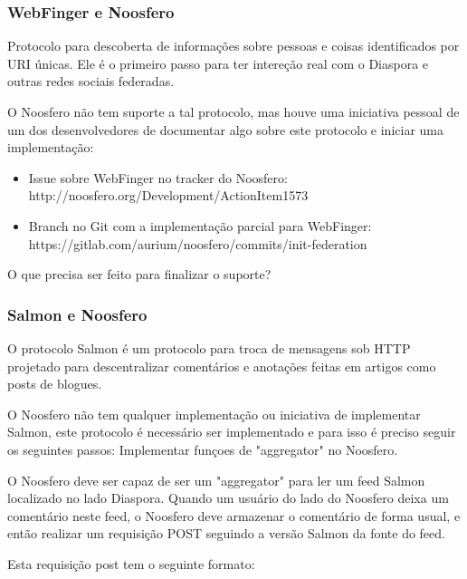 \documentclass[12pt]{article}
\begin{document}
\subsubsection{WebFinger e Noosfero}

Protocolo para descoberta de informações sobre pessoas e coisas identificados
por URI únicas. Ele é o primeiro passo para ter intereção real com o Diaspora
e outras redes sociais federadas.

O Noosfero não tem suporte a tal protocolo, mas houve uma iniciativa pessoal
de um dos desenvolvedores de documentar algo sobre este protocolo e iniciar
uma implementação:

\begin{itemize}
  \item Issue sobre WebFinger no tracker do Noosfero: \\
    http://noosfero.org/Development/ActionItem1573
  \item Branch no Git com a implementação parcial para WebFinger: \\
    https://gitlab.com/aurium/noosfero/commits/init-federation
\end{itemize}

O que precisa ser feito para finalizar o suporte?

\subsubsection{Salmon e Noosfero}

O protocolo Salmon é um protocolo para troca de mensagens sob HTTP projetado
para descentralizar comentários e anotações feitas em artigos como posts de
blogues.

O Noosfero não tem qualquer implementação ou iniciativa de implementar Salmon,
este protocolo é necessário ser implementado e para isso é preciso seguir os
seguintes passos: Implementar funçoes de "aggregator" no Noosfero.

O Noosfero deve ser capaz de ser um "aggregator" para ler um feed Salmon
localizado no lado Diaspora. Quando um usuário do lado do Noosfero deixa um
comentário neste feed, o Noosfero deve armazenar o comentário de forma usual,
e então realizar um requisição POST\cite{salmon} seguindo a versão Salmon da fonte do feed.

Esta requisição post tem o seguinte formato:
\end{document}
